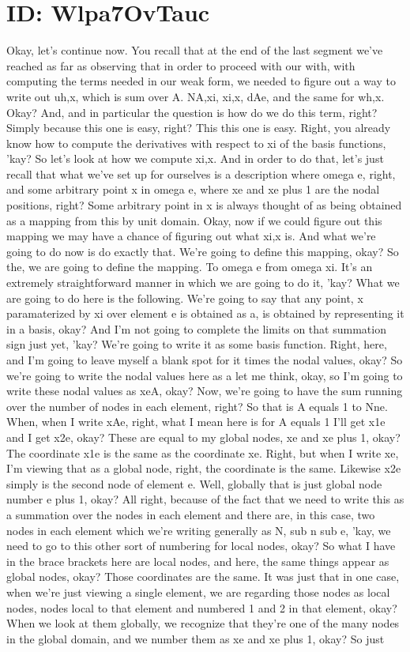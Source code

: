 \documentclass[10pt]{article}
\begin{document}
\section*{ID: Wlpa7OvTauc}
Okay, let's continue now. You recall that at the end of the last segment we've reached as far as observing that in order to proceed with our with, with computing the terms needed in our weak form, we needed to figure out a way to write out uh,x, which is sum over A. NA,xi, xi,x, dAe, and the same for wh,x. Okay? And, and in particular the question is how do we do this term, right? Simply because this one is easy, right? This this one is easy. Right, you already know how to compute the derivatives with respect to xi of the basis functions, 'kay? So let's look at how we compute xi,x. And in order to do that, let's just recall that what we've set up for ourselves is a description where omega e, right, and some arbitrary point x in omega e, where xe and xe plus 1 are the nodal positions, right? Some arbitrary point in x is always thought of as being obtained as a mapping from this by unit domain. Okay, now if we could figure out this mapping we may have a chance of figuring out what xi,x is. And what we're going to do now is do exactly that. We're going to define this mapping, okay? So the, we are going to define the mapping. To omega e from omega xi. It's an extremely straightforward manner in which we are going to do it, 'kay? What we are going to do here is the following. We're going to say that any point, x paramaterized by xi over element e is obtained as a, is obtained by representing it in a basis, okay? And I'm not going to complete the limits on that summation sign just yet, 'kay? We're going to write it as some basis function. Right, here, and I'm going to leave myself a blank spot for it times the nodal values, okay? So we're going to write the nodal values here as a let me think, okay, so I'm going to write these nodal values as xeA, okay? Now, we're going to have the sum running over the number of nodes in each element, right? So that is A equals 1 to Nne. When, when I write xAe, right, what I mean here is for A equals 1 I'll get x1e and I get x2e, okay? These are equal to my global nodes, xe and xe plus 1, okay? The coordinate x1e is the same as the coordinate xe. Right, but when I write xe, I'm viewing that as a global node, right, the coordinate is the same. Likewise x2e simply is the second node of element e. Well, globally that is just global node number e plus 1, okay? All right, because of the fact that we need to write this as a summation over the nodes in each element and there are, in this case, two nodes in each element which we're writing generally as N, sub n sub e, 'kay, we need to go to this other sort of numbering for local nodes, okay? So what I have in the brace brackets here are local nodes, and here, the same things appear as global nodes, okay? Those coordinates are the same. It was just that in one case, when we're just viewing a single element, we are regarding those nodes as local nodes, nodes local to that element and numbered 1 and 2 in that element, okay? When we look at them globally, we recognize that they're one of the many nodes in the global domain, and we number them as xe and xe plus 1, okay? So just 
\end{document}
